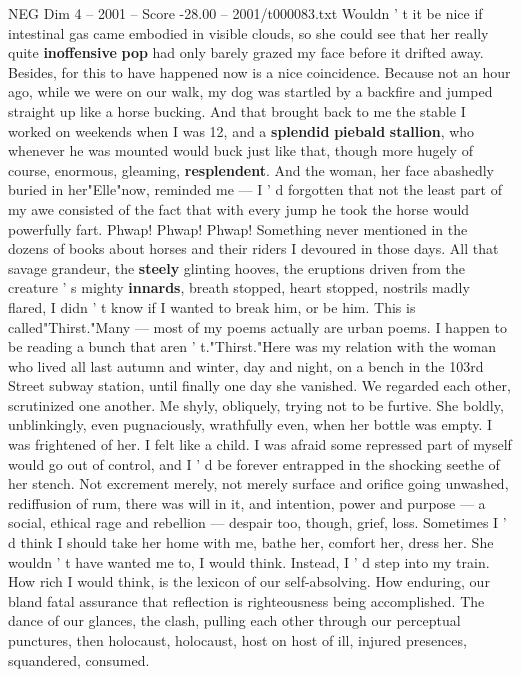 \begin{textsample}{NEG Dim 4 – 2001 – Score -28.00 – 2001/t000083.txt}
Wouldn ' t it be nice if intestinal gas came embodied in visible clouds, so she could see that her really quite \textbf{inoffensive} \textbf{pop} had only barely grazed my face before it drifted away.
Besides, for this to have happened now is a nice coincidence.
Because not an hour ago, while we were on our walk, my dog was startled by a backfire and jumped straight up like a horse bucking.
And that brought back to me the stable I worked on weekends when I was 12, and a \textbf{splendid} \textbf{piebald} \textbf{stallion}, who whenever he was mounted would buck just like that, though more hugely of course, enormous, gleaming, \textbf{resplendent}.
And the woman, her face abashedly buried in her"Elle"now, reminded me — I ' d forgotten that not the least part of my awe consisted of the fact that with every jump he took the horse would powerfully fart.
Phwap!
Phwap!
Phwap!
Something never mentioned in the dozens of books about horses and their riders I devoured in those days.
All that savage grandeur, the \textbf{steely} glinting hooves, the eruptions driven from the creature ' s mighty \textbf{innards}, breath stopped, heart stopped, nostrils madly flared, I didn ' t know if I wanted to break him, or be him.
This is called"Thirst."Many — most of my poems actually are urban poems.
I happen to be reading a bunch that aren ' t."Thirst."Here was my relation with the woman who lived all last autumn and winter, day and night, on a bench in the 103rd Street subway station, until finally one day she vanished.
We regarded each other, scrutinized one another.
Me shyly, obliquely, trying not to be furtive.
She boldly, unblinkingly, even pugnaciously, wrathfully even, when her bottle was empty.
I was frightened of her.
I felt like a child.
I was afraid some repressed part of myself would go out of control, and I ' d be forever entrapped in the shocking seethe of her stench.
Not excrement merely, not merely surface and orifice going unwashed, rediffusion of rum, there was will in it, and intention, power and purpose — a social, ethical rage and rebellion — despair too, though, grief, loss.
Sometimes I ' d think I should take her home with me, bathe her, comfort her, dress her.
She wouldn ' t have wanted me to, I would think.
Instead, I ' d step into my train.
How rich I would think, is the lexicon of our self-absolving.
How enduring, our bland fatal assurance that reflection is righteousness being accomplished.
The dance of our glances, the clash, pulling each other through our perceptual punctures, then holocaust, holocaust, host on host of ill, injured presences, squandered, consumed.

\end{textsample}
